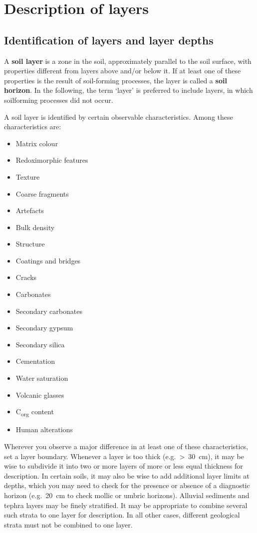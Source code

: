 \documentclass[
  letterpaper,
  DIV=11,
  numbers=noendperiod]{scrreprt}
\providecommand{\tightlist}{%
  \setlength{\itemsep}{0pt}\setlength{\parskip}{0pt}}\usepackage{longtable,booktabs,array}
\begin{document}
\hypertarget{description-of-layers}{%
\section{Description of layers}\label{description-of-layers}}

\hypertarget{identification-of-layers-and-layer-depths}{%
\subsection{Identification of layers and layer
depths}\label{identification-of-layers-and-layer-depths}}

A \textbf{soil layer} is a zone in the soil, approximately parallel to
the soil surface, with properties different from layers above and/or
below it. If at least one of these properties is the result of
soil-forming processes, the layer is called a \textbf{soil horizon}. In
the following, the term `layer' is preferred to include layers, in which
soilforming processes did not occur.

A soil layer is identified by certain observable characteristics. Among
these characteristics are:

\begin{itemize}
\tightlist
\item
  Matrix colour
\item
  Redoximorphic features
\item
  Texture
\item
  Coarse fragments
\item
  Artefacts
\item
  Bulk density
\item
  Structure
\item
  Coatings and bridges
\item
  Cracks
\item
  Carbonates
\item
  Secondary carbonates
\item
  Secondary gypsum
\item
  Secondary silica
\item
  Cementation
\item
  Water saturation
\item
  Volcanic glasses
\item
  C\textsubscript{org} content
\item
  Human alterations
\end{itemize}

Wherever you observe a major difference in at least one of these
characteristics, set a layer boundary. Whenever a layer is too thick
(e.g.~\textgreater~30~cm), it may be wise to subdivide it into two or
more layers of more or less equal thickness for description. In certain
soils, it may also be wise to add additional layer limits at depths,
which you may need to check for the presence or absence of a diagnostic
horizon (e.g.~20~cm to check mollic or umbric horizons). Alluvial
sediments and tephra layers may be finely stratified. It may be
appropriate to combine several such strata to one layer for description.
In all other cases, different geological strata must not be combined to
one layer.
\end{document}
